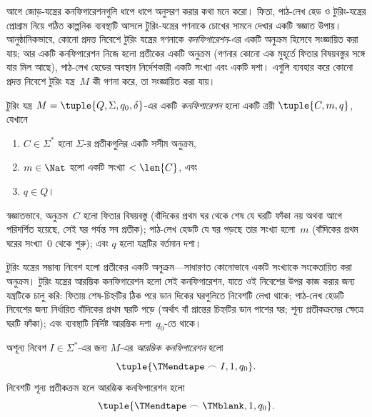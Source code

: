 \documentclass[../../../include/open-logic-section]{subfiles}
\begin{document}

\begin{explain}
আগে জোড়-যন্ত্রের কনফিগারেশনগুলি ধাপে ধাপে অনুসরণ করার কথা মনে করো।
ফিতা, পাঠ-লেখ হেড ও টুরিং-যন্ত্রের প্রোগ্রাম নিয়ে গঠিত কাল্পনিক
ব্যবস্থাটি আসলে টুরিং-যন্ত্রের গণনাকে চোখের সামনে দেখার একটি স্বজ্ঞাত
উপায়। আনুষ্ঠানিকভাবে, কোনো প্রদত্ত নিবেশে টুরিং যন্ত্রের গণনাকে
\emph{কনফিগারেশন}-এর একটি অনুক্রম হিসেবে সংজ্ঞায়িত করা যায়; আর একটি
কনফিগারেশন নিজে হলো প্রতীকের একটি অনুক্রম (গণনার কোনো এক মুহূর্তে ফিতার
বিষয়বস্তুর সঙ্গে যার মিল আছে), পাঠ-লেখ হেডের অবস্থান নির্দেশকারী একটি
সংখ্যা এবং একটি দশা। এগুলি ব্যবহার করে কোনো প্রদত্ত নিবেশে টুরিং
যন্ত্র~$M$ কী গণনা করে, তা সংজ্ঞায়িত করা যায়।
\end{explain}

\begin{defn}[কনফিগারেশন]
টুরিং যন্ত্র $M = \tuple{Q, \Sigma, q_0, \delta}$-এর একটি
\emph{কনফিগারেশন} হলো একটি ত্রয়ী $\tuple{C, m, q}$, যেখানে
\begin{enumerate}
\item $C \in \Sigma^*$ হলো $\Sigma$-র প্রতীকগুলির একটি সসীম অনুক্রম,
\item $m \in \Nat$ হলো একটি সংখ্যা $< \len{C}$, এবং
\item $q \in Q$।
\end{enumerate}
স্বজ্ঞাতভাবে, অনুক্রম~$C$ হলো ফিতার বিষয়বস্তু (বাঁদিকের প্রথম ঘর থেকে
শেষ যে ঘরটি ফাঁকা নয় অথবা আগে পরিদর্শিত হয়েছে, সেই ঘর পর্যন্ত সব
প্রতীক); পাঠ-লেখ হেডটি যে ঘর পড়ছে তার সংখ্যা হলো~$m$ (বাঁদিকের প্রথম
ঘরের সংখ্যা~$0$ থেকে শুরু); এবং $q$ হলো যন্ত্রটির বর্তমান দশা।
\end{defn}

\begin{explain}
টুরিং যন্ত্রের সম্ভাব্য নিবেশ হলো প্রতীকের একটি অনুক্রম—সাধারণত কোনোভাবে
একটি সংখ্যাকে সংকেতায়িত করা অনুক্রম। টুরিং যন্ত্রের আরম্ভিক কনফিগারেশন
হলো সেই কনফিগারেশন, যাতে ওই নিবেশের উপর কাজ করার জন্য যন্ত্রটিকে চালু
করি: ফিতায় শেষ-চিহ্নটির ঠিক পরে ডান দিকের ঘরগুলিতে নিবেশটি লেখা থাকে;
পাঠ-লেখ হেডটি নিবেশের জন্য নির্ধারিত বাঁদিকের প্রথম ঘরটি পড়ে (অর্থাৎ
বাঁ প্রান্তের চিহ্নটির ডান পাশের ঘর; শূন্য প্রতীকক্রমের ক্ষেত্রে ঘরটি
ফাঁকা); এবং ব্যবস্থাটি নির্দিষ্ট আরম্ভিক দশা~$q_0$-তে থাকে।
\end{explain}

\begin{defn}
অশূন্য নিবেশ $I \in \Sigma^*$-এর জন্য $M$-এর \emph{আরম্ভিক
কনফিগারেশন} হলো
\[
\tuple{\TMendtape \frown I, 1, q_0}.
\]
নিবেশটি শূন্য প্রতীকক্রম হলে আরম্ভিক কনফিগারেশন হলো
\[
\tuple{\TMendtape \frown \TMblank, 1, q_0}.
\]

\end{defn}
\end{document}
